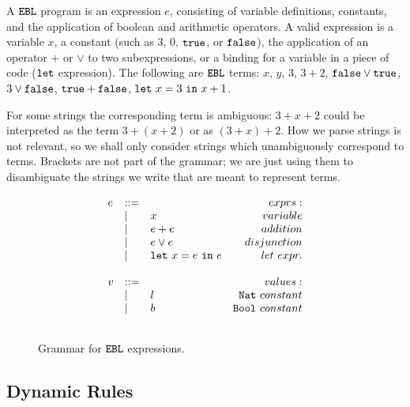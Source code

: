 A $\mathtt{EBL}$ program is an expression $e$, consisting of variable definitions, constants, and the application of boolean and arithmetic operators. A valid expression is a variable $x$, a constant (such as $3$, $0$, $\mathtt{true}$, or $\mathtt{false}$), the application of an operator $+$ or $\lor$ to two subexpressions, or a binding for a variable in a piece of code ($\mathtt{let}$ expression). The following are $\mathtt{EBL}$ terms: $x$, $y$, $3$, $3+2$, $\mathtt{false} \lor \mathtt{true}$, $3 \lor \mathtt{false}$, $\mathtt{true} + \mathtt{false}$, $\mathtt{let}~ x = 3~\mathtt{in}~ x+1$.

For some strings the corresponding term is ambiguous: $3 + x + 2$ could be interpreted as the term $3 + (x + 2)$ or as $(3 + x) + 2$. How we parse strings is not relevant, so we shall only consider strings which unambiguously correspond to terms. Brackets are not part of the grammar; we are just using them to disambiguate the strings we write that are meant to represent terms.\\

\begin{figure}[h]

\[
\begin{array}{c}

\begin{array}{lllr}

e & ::= & ~ & exprs: \\
	& | & x & variable \\
	& | & e + e & addition \\
	& | & e \lor e & disjunction \\
	& | & \mathtt{let}~ x = e~\mathtt{in}~ e & let~expr. \\
	&&\\
	
v & ::= & ~ & values: \\
	& | & l & \mathtt{Nat}~constant \\
	& | & b & \mathtt{Bool}~constant \\
	&&\\

\end{array}

\end{array}
\]

\vspace{-12pt}
\caption{Grammar for $\mathtt{EBL}$ expressions.}
\label{fig:ebl_grammar}
\end{figure}


\subsection{Dynamic Rules}

